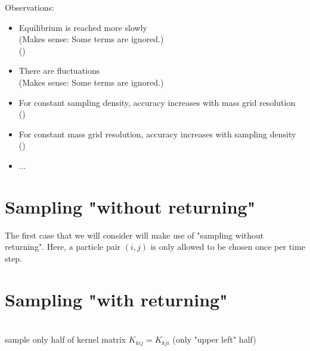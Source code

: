     Observations:
    \begin{itemize}
        \item Equilibrium is reached more slowly \\ 
            (Makes sense: Some terms are ignored.) \\
            ()
        \item There are fluctuations \\ 
            (Makes sense: Some terms are ignored.)
        \item For constant sampling density, accuracy increases with mass grid resolution \\
            ()
        \item For constant mass grid resolution, accuracy increases with sampling density \\
            ()
        \item ...
    \end{itemize}

\section{Sampling "without returning"}

    The first case that we will consider will make use of "sampling without returning". Here, a 
    particle pair $(i, j)$ is only allowed to be chosen once per time step.


\section{Sampling "with returning"}



 \\
sample only half of kernel matrix $K_{kij} = K_{kji}$ (only "upper left" half) \\

